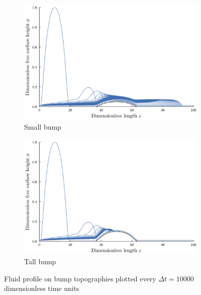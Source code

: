 \documentclass[letterpaper]{article}
\begin{document}
\begin{figure}[h]
    \centering
    \begin{subfigure}[b]{0.5\textwidth}
        \includegraphics[width=\textwidth]{images/bump_05/plt_notitle.png}
        \caption{Small bump}
        \label{fig:bump05_profile}
    \end{subfigure}%
    \begin{subfigure}[b]{0.5\textwidth}
        \includegraphics[width=\textwidth]{images/bump_10_shorter/plt_notitle.png}
        \caption{Tall bump}
        \label{fig:bump10_profile}
    \end{subfigure}
    \caption{Fluid profile on bump topographies plotted every $\Delta t = 10000$ dimensionless time units}
    \label{fig:bump_profiles}
\end{figure}

\newpage
\begin{appendices}
    
\end{appendices}

\newpage
\printbibliography
\end{document}
